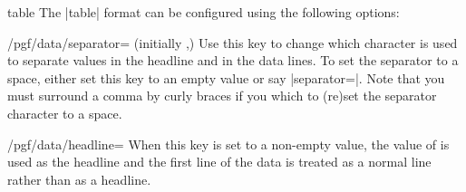 \begin{dataformat}{table}
    The |table| format can be configured using the following options:
    \begin{key}{/pgf/data/separator= (initially ,)}
        Use this key to change which character is used to separate values in
        the headline and in the data lines. To set the separator to a space,
        either set this key to an empty value or say |separator=\space|. Note
        that you must surround a comma by curly braces if you which to (re)set
        the separator character to a space.
\begin{codeexample}[preamble={\usetikzlibrary{datavisualization}}]
\end{codeexample}
    \end{key}
    \begin{key}{/pgf/data/headline=}
        When this key is set to a non-empty value, the value of 
        is used as the headline and the first line of the data is treated as a
        normal line rather than as a headline.
\begin{codeexample}[preamble={\usetikzlibrary{datavisualization}}]
\end{codeexample}
    \end{key}
\end{dataformat}

